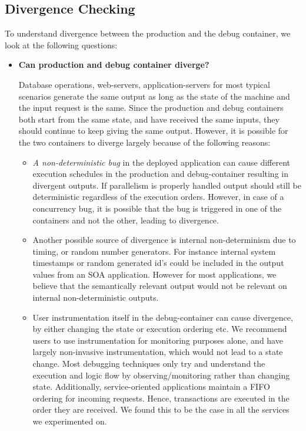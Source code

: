 \subsection{Divergence Checking}
\label{sec:parikshanDivergenceChecking}

To understand divergence between the production and the debug container, we look at the following questions:

\begin{itemize}
	\item \textbf{Can production and debug container diverge?}
	
	Database operations, web-servers, application-servers for most typical scenarios generate the same output as long as the state of the machine and the input request is the same. 
	Since the production and debug containers both start from the same state, and have received the same inputs, they should continue to keep giving the same output.
	However, it is possible for the two containers to diverge largely because of the following reasons:
	\begin{itemize}
		\item \emph{A non-deterministic bug} in the deployed application can cause different execution schedules in the production and debug-container resulting in divergent outputs. 
		If parallelism is properly handled output should still be deterministic regardless of the execution orders.
		However, in case of a concurrency bug, it is possible that the bug is triggered in one of the containers and not the other, leading to divergence.
		\item Another possible source of divergence is internal non-determinism due to timing, or random number generators. 
		For instance internal system timestamps or random generated id's could be included in the output values from an SOA application. 
		However for most applications, we believe that the semantically relevant output would not be relevant on internal non-deterministic outputs.		
		\item User instrumentation itself in the debug-container can cause divergence, by either changing the state or execution ordering etc. 
		We recommend \parikshan users to use instrumentation for monitoring purposes alone, and have largely non-invasive instrumentation, which would not lead to a state change.
		Most debugging techniques only try and understand the execution and logic flow by observing/monitoring rather than changing state.
		Additionally, service-oriented applications maintain a FIFO ordering for incoming requests. 
		Hence, transactions are executed in the order they are received. We found this to be the case in all the services we experimented on.
	\end{itemize}
	

\end{itemize}
